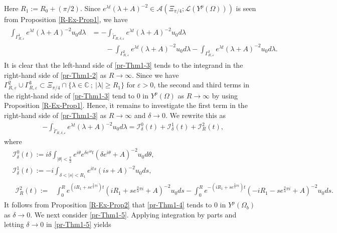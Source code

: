 \documentclass[dvipdfmx,12pt]{article}
\begin{document}
Here $R_1:=R_0+(\pi/2)$. 
Since $e^{\lambda t} (\lambda+A)^{-2}\in \mathcal{A}(\Xi_{\pi/4}; \mathcal{L}(Y^p(\Omega) ) )$ is seen from Proposition \ref{R-Ex-Prop1}, we have
\begin{gather}\label{pr-Thm1-3}
\begin{aligned}
\int_{\Gamma_{R,\varepsilon}^1}e^{\lambda t} (\lambda+A)^{-2} u_0 d\lambda &=-\int_{\widetilde{\Gamma}_{R,\delta,\varepsilon}}e^{\lambda t} (\lambda+A)^{-2} u_0 d\lambda\\
&\qquad-\int_{\Gamma_{R,\varepsilon}^2}e^{\lambda t} (\lambda+A)^{-2} u_0 d\lambda-\int_{\Gamma_{R,\varepsilon}^3}e^{\lambda t} (\lambda+A)^{-2} u_0 d\lambda.
\end{aligned}
\end{gather}
It is clear that the left-hand side of \eqref{pr-Thm1-3} tends to the integrand in the right-hand side of \eqref{pr-Thm1-2} as $R\to\infty$. Since we have $\Gamma_{R,\varepsilon}^2\cup \Gamma_{R,\varepsilon}^3 \subset \Xi_{\pi/4}\cap \{\lambda\in\mathbb{C}~;~|\lambda|\ge R_1\}$ for $\varepsilon>0$, the second and third terms in the right-hand side of \eqref{pr-Thm1-3} tend to 0 in $Y^p(\Omega)$ as $R\to\infty$ by using Proposition \ref{R-Ex-Prop1}.  Hence, it remains to investigate the first term in the right-hand side of \eqref{pr-Thm1-3} as $R\to\infty$ and $\delta\to 0$. We rewrite this as
\begin{align*}
&-\int_{\widetilde{\Gamma}_{R,\delta,\varepsilon}}e^{\lambda t} (\lambda+A)^{-2} u_0 d\lambda=\mathcal{I}_{\delta}^0(t)+\mathcal{I}_{ \delta}^{1 }(t)+\mathcal{I}_{R}^{2}(t), 
\end{align*}
where
\begin{align}
&\mathcal{I}_{\delta}^0(t):=i\delta \int_{|\theta|<\frac{\pi}{2}}e^{i\theta} e^{\delta e^{i\theta}t} (\delta e^{i\theta}+A)^{-2}u_0 d\theta, \label{pr-Thm1-4}  \\
&\mathcal{I}_\delta^{1 }(t):=-i\int_{\delta<|s|<R_1}e^{its} (is+A)^{-2}u_0 ds, \label{pr-Thm1-5} \\
&
\begin{aligned}
\mathcal{I}_R^{2}(t):=&\int_{0}^R e^{(iR_1+s e^{\frac{3}{4}\pi i}) t} (iR_1+s e^{\frac{3}{4}\pi i}+A)^{-2} u_0 ds -\int_{0}^R e^{-(iR_1+s e^{\frac{3}{4}\pi i}) t} (-iR_1-s e^{\frac{3}{4}\pi i}+A)^{-2} u_0 ds.
\end{aligned} \label{pr-Thm1-6}
\end{align}
It follows from Proposition \ref{R-Ex-Prop2} that \eqref{pr-Thm1-4} tends to 0 in $Y^p(\Omega_b)$ as $\delta\to0$. We next consider \eqref{pr-Thm1-5}.  Applying integration by parts and letting $\delta\to0$ in \eqref{pr-Thm1-5} yields
\end{document}
